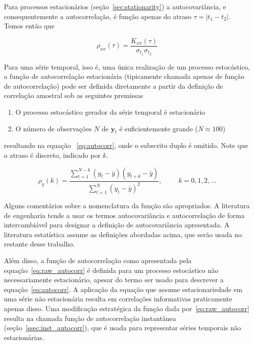 Para processos estacionários (seção~\ref{sec:stationarity}) a autocovariância,
e consequentemente a autocorrelação, é função apenas do atraso $\tau = |t_1 -
t_2|$. Temos então que

$$\rho_{xx}(\tau) =\frac{K_{xx}(\tau)}{\sigma_{t_1}\sigma_{t_2}}$$

Para uma série temporal, isso é, uma única  realização de um processo
estocástico, a função de autocorrelação estacionária (tipicamente chamada
apenas de função de autocorrelação) pode ser definida diretamente a partir da
definição de correlação amostral sob as seguintes premissas

\begin{enumerate}
    \item O processo estocástico gerador da série temporal é estacionário
    \item O número de observações  $N$ de $\mathbf{y}_t$ é suficientemente
    grande ($N \approx 100$)
\end{enumerate}

resultando na equação ~\ref{eq:autocorr}, onde o subscrito duplo é omitido.
Note que o atraso é discreto, indicado por $k$.

\vspace{1cm}

\begin{equation}\label{eq:autocorr}
    \rho_y(k) = \frac{\sum_{t=1}^{N-k}(y_t - \bar{y})(y_{t+k}-\bar{y})}{\sum_{t=1}^{N}(y_t - \bar{y})^2}  , \hspace{1cm} k = 0, 1, 2, \dots
\end{equation}

Alguns comentários sobre a nomenclatura da função são apropriados. A literatura
de engenharia tende a usar os termos autocovariância e autocorrelação de forma
intercambiável para designar a definição de autocovariância apresentada. A
literatura estatística assume as definições abordadas acima, que serão usada no
restante desse trabalho.

Além disso, a função de autocorrelação como apresentada pela
equação~\ref{eq:raw_autocorr} é definida para um processo estocástico não
necessariamente estacionário, apesar do termo ser usado para descrever a
equação~\ref{eq:autocorr}. A aplicação da equação que assume estacionariedade
em uma série não estacionária resulta em correlações informativas praticamente
apenas disso. Uma modificação estratégica da função dada
por~\ref{eq:raw_autocorr} resulta na chamada função de autocorrelação
instantânea (seção~\ref{ssec:inst_autocorr}), que é usada para representar
séries temporais não estacionárias.

